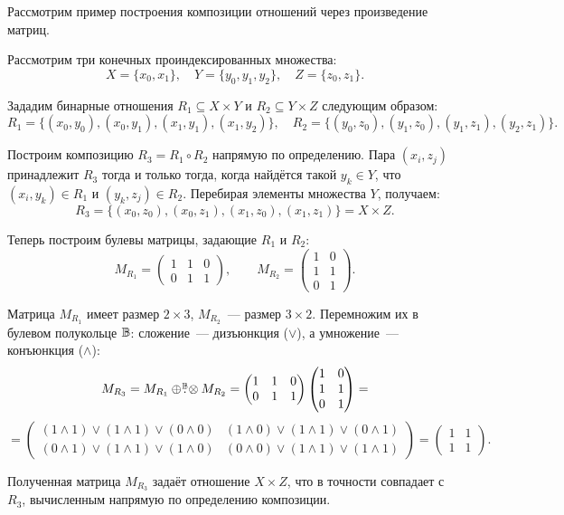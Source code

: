 Рассмотрим пример построения композиции отношений через произведение матриц.
\begin{example}
    Рассмотрим три конечных проиндексированных множества:
    \[X = \{x_0, x_1\}, \quad Y = \{y_0, y_1, y_2\}, \quad Z = \{z_0, z_1\}.\]

    Зададим бинарные отношения $R_1 \subseteq X \times Y$ и $R_2 \subseteq Y \times Z$ следующим образом:
    \[
    R_1 = \{(x_0, y_0), (x_0, y_1), (x_1, y_1), (x_1, y_2)\}, \quad
    R_2 = \{(y_0, z_0), (y_1, z_0), (y_1, z_1), (y_2, z_1)\}.
    \]

    Построим композицию $R_3 = R_1 \circ R_2$ напрямую по определению.
    Пара $(x_i, z_j)$ принадлежит $R_3$ тогда и только тогда, когда найдётся такой $y_k \in Y$, что $(x_i, y_k) \in R_1$ и $(y_k, z_j) \in R_2$.
    Перебирая элементы множества $Y$, получаем:
    \[
    R_3 = \{(x_0, z_0), (x_0, z_1), (x_1, z_0), (x_1, z_1)\} = X \times Z.
    \]

    Теперь построим булевы матрицы, задающие $R_1$ и $R_2$:
    \[
    M_{R_1} = \begin{pmatrix}
    1 & 1 & 0\\
    0 & 1 & 1
    \end{pmatrix}, \qquad
    M_{R_2} = \begin{pmatrix}
    1 & 0\\
    1 & 1\\
    0 & 1
    \end{pmatrix}.
    \]

    Матрица $M_{R_1}$ имеет размер $2 \times 3$, $M_{R_2}$~--- размер $3 \times 2$.
    Перемножим их в булевом полукольце $\mathbb{B}$: сложение~--- дизъюнкция ($\lor$), а умножение~--- конъюнкция ($\land$):
    \[
    M_{R_3} = M_{R_1} \oplus \! \overset{\mathbb{\mathbb{B}}}{.} \! \otimes M_{R_2} =
    \begin{pmatrix}
    1 & 1 & 0\\
    0 & 1 & 1
    \end{pmatrix}
    \begin{pmatrix}
    1 & 0\\
    1 & 1\\
    0 & 1
    \end{pmatrix} =
    \]
    \[
    =
    \begin{pmatrix}
    (1 \land 1) \lor (1 \land 1) \lor (0 \land 0) & (1 \land 0) \lor (1 \land 1) \lor (0 \land 1)\\
    (0 \land 1) \lor (1 \land 1) \lor (1 \land 0) & (0 \land 0) \lor (1 \land 1) \lor (1 \land 1)
    \end{pmatrix} =
    \begin{pmatrix}
    1 & 1\\
    1 & 1
    \end{pmatrix}.
    \]

    Полученная матрица $M_{R_3}$ задаёт отношение $X \times Z$, что в точности совпадает с $R_3$, вычисленным напрямую по определению композиции.
\end{example}
